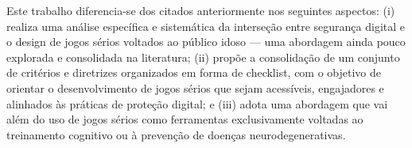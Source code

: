 Este trabalho diferencia-se dos citados anteriormente nos seguintes aspectos: (i) realiza uma análise específica e sistemática da interseção entre segurança digital e o design de jogos sérios voltados ao público idoso — uma abordagem ainda pouco explorada e consolidada na literatura; (ii) propõe a consolidação de um conjunto de critérios e diretrizes organizados em forma de checklist, com o objetivo de orientar o desenvolvimento de jogos sérios que sejam acessíveis, engajadores e alinhados às práticas de proteção digital; e (iii) adota uma abordagem que vai além do uso de jogos sérios como ferramentas exclusivamente voltadas ao treinamento cognitivo ou à prevenção de doenças neurodegenerativas.
